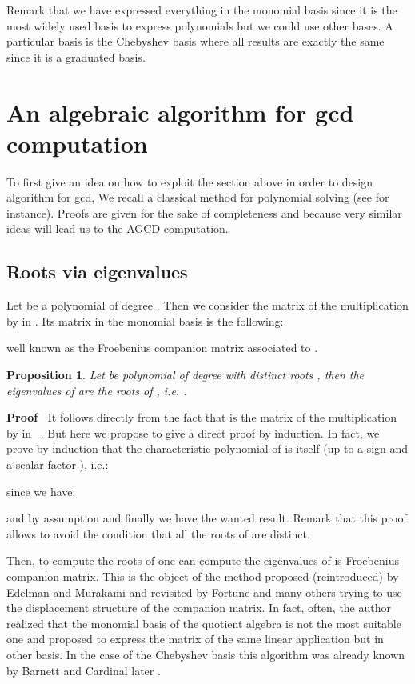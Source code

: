 \documentclass{article}
\newenvironment{proof}{\noindent\textbf{Proof\ }}{\hspace*{\fill}\medskip}
\newtheorem{proposition}{Proposition}
\begin{document}
Remark that we have expressed everything in the monomial basis since it is the
most widely used basis to express polynomials but we could use other bases. A
particular basis is the Chebyshev basis where all results are exactly the same
since it is a graduated basis.

\section{An algebraic algorithm for gcd computation\label{exact}}



To first give an idea on how to exploit the section above in order to design
algorithm for gcd, We recall a classical method for polynomial solving (see
{\cite{C}} for instance). Proofs are given for the sake of completeness and
because very similar ideas will lead us to the AGCD computation.

\subsection{Roots via eigenvalues}



Let 
be a polynomial of degree . Then we consider the matrix of the
multiplication by  in . Its matrix in the monomial
basis  is the following:

well known as the Froebenius companion matrix associated to .

\begin{proposition}
  Let be polynomial of degree  with  distinct
  roots , then the eigenvalues of
   are the roots of , i.e. . \ 
\end{proposition}

\begin{proof}
  It follows directly from the fact that  is the matrix of
  the multiplication by  in \ . But here we propose
  to give a direct proof by induction. In fact, we prove by induction that the
  characteristic polynomial of  is  itself (up to a
  sign and a scalar factor ), i.e.:
  
  since we have:
  
  and by assumption  and
  finally we have the wanted result. Remark that this proof allows to avoid
  the condition that all the roots of  are distinct.
\end{proof}

Then, to compute the roots of  one can compute the eigenvalues of is
Froebenius companion matrix. This is the object of the method proposed
(reintroduced) by Edelman and Murakami {\cite{EM}} and revisited by Fortune
{\cite{F}} and many others trying to use the displacement structure of the
companion matrix. In fact, often, the author realized that the monomial basis
of the quotient algebra is not the most suitable one and proposed to express
the matrix of the same linear application but in other basis. In the case of
the Chebyshev basis this algorithm was already known by Barnett {\cite{B}} and
Cardinal later {\cite{C}}.
\end{document}
